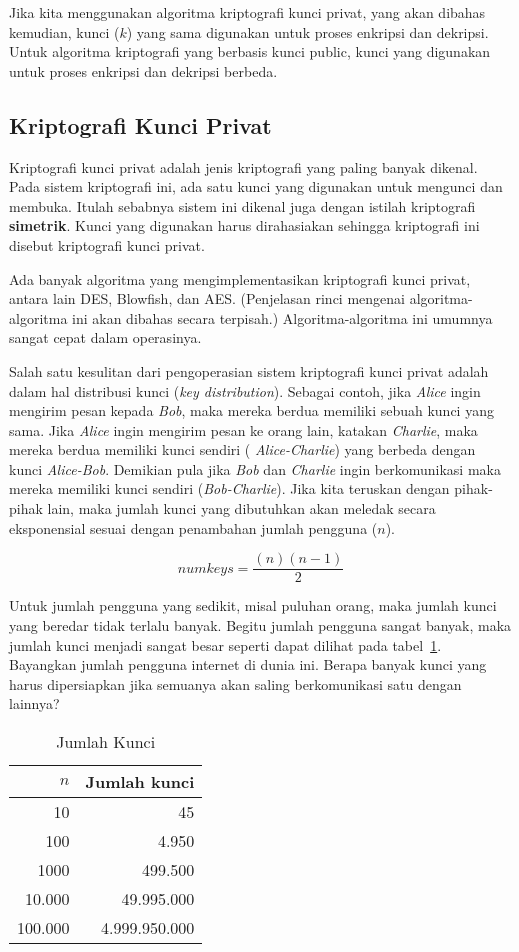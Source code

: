 Jika kita menggunakan algoritma kriptografi kunci privat, yang akan dibahas
kemudian, kunci ($k$) yang sama digunakan untuk proses enkripsi dan dekripsi.
Untuk algoritma kriptografi yang berbasis kunci public, kunci yang digunakan
untuk proses enkripsi dan dekripsi berbeda.


\subsection{Kriptografi Kunci Privat}
Kriptografi kunci privat adalah jenis kriptografi yang paling banyak dikenal.
Pada sistem kriptografi ini, ada satu kunci yang digunakan untuk mengunci dan
membuka. Itulah sebabnya sistem ini dikenal juga dengan istilah kriptografi
{\bf simetrik}. Kunci yang digunakan harus dirahasiakan sehingga kriptografi
ini disebut kriptografi kunci privat.

Ada banyak algoritma yang mengimplementasikan kriptografi kunci privat, antara
lain DES, Blowfish, dan AES. (Penjelasan rinci mengenai algoritma-algoritma ini
akan dibahas secara terpisah.) Algoritma-algoritma ini umumnya sangat cepat
dalam operasinya.

Salah satu kesulitan dari pengoperasian sistem kriptografi kunci privat adalah
dalam hal distribusi kunci ({\em key distribution}). Sebagai contoh, jika {\em
Alice} ingin mengirim pesan kepada {\em Bob}, maka mereka berdua memiliki
sebuah kunci yang sama. Jika {\em Alice} ingin mengirim pesan ke orang lain,
katakan {\em Charlie}, maka mereka berdua memiliki kunci sendiri ({\em
Alice-Charlie}) yang berbeda dengan kunci {\em Alice-Bob}. Demikian pula jika
{\em Bob} dan {\em Charlie} ingin berkomunikasi maka mereka memiliki kunci
sendiri ({\em Bob-Charlie}). Jika kita teruskan dengan pihak-pihak lain, maka
jumlah kunci yang dibutuhkan akan meledak secara eksponensial sesuai dengan
penambahan jumlah pengguna ($n$).

\begin{equation}
   numkeys = \frac{(n) (n-1)}{2}
\end{equation}

Untuk jumlah pengguna yang sedikit, misal puluhan orang, maka jumlah kunci yang
beredar tidak terlalu banyak. Begitu jumlah pengguna sangat banyak, maka jumlah
kunci menjadi sangat besar seperti dapat dilihat pada
tabel~\ref{tbl:jumlahkunci}. Bayangkan jumlah pengguna internet di dunia ini.
Berapa banyak kunci yang harus dipersiapkan jika semuanya akan saling
berkomunikasi satu dengan lainnya?

\begin{table}
   \centering
   \caption{Jumlah Kunci}
   \label{tbl:jumlahkunci}
\begin{tabular}{ r r }
   $n$ & Jumlah kunci \\
   \hline
  10 & 45 \\
  100 & 4.950 \\
  1000 & 499.500 \\
  10.000 & 49.995.000 \\
  100.000 & 4.999.950.000 \\
\end{tabular}
\end{table}

